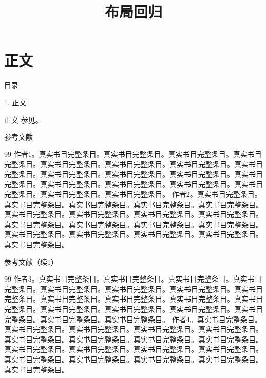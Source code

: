 \documentclass[aspectratio=169,10pt,fontset=fandol]{ctexbeamer}
\title{布局回归}
\begin{document}
\section{正文}
\begin{frame}[t,fragile]{目录}
\normalsize
{\color{blue}\normalsize 1. 正文\par}\vspace{0.22em}
\end{frame}
\begin{frame}[t,fragile]{正文}
\normalsize
{\normalsize
参见\cite{K1}。
}
\end{frame}
\begin{frame}[t,fragile]{参考文献}
\footnotesize
{\footnotesize
\begin{thebibliography}{99} 作者1。真实书目完整条目。真实书目完整条目。真实书目完整条目。真实书目完整条目。真实书目完整条目。真实书目完整条目。真实书目完整条目。真实书目完整条目。真实书目完整条目。真实书目完整条目。真实书目完整条目。真实书目完整条目。真实书目完整条目。真实书目完整条目。真实书目完整条目。真实书目完整条目。真实书目完整条目。真实书目完整条目。
 作者2。真实书目完整条目。真实书目完整条目。真实书目完整条目。真实书目完整条目。真实书目完整条目。真实书目完整条目。真实书目完整条目。真实书目完整条目。真实书目完整条目。真实书目完整条目。真实书目完整条目。真实书目完整条目。真实书目完整条目。真实书目完整条目。真实书目完整条目。真实书目完整条目。真实书目完整条目。真实书目完整条目。

\end{thebibliography}
}
\end{frame}
\begin{frame}[t,fragile]{参考文献（续1）}
\footnotesize
{\footnotesize
\begin{thebibliography}{99}
 作者3。真实书目完整条目。真实书目完整条目。真实书目完整条目。真实书目完整条目。真实书目完整条目。真实书目完整条目。真实书目完整条目。真实书目完整条目。真实书目完整条目。真实书目完整条目。真实书目完整条目。真实书目完整条目。真实书目完整条目。真实书目完整条目。真实书目完整条目。真实书目完整条目。真实书目完整条目。真实书目完整条目。
 作者4。真实书目完整条目。真实书目完整条目。真实书目完整条目。真实书目完整条目。真实书目完整条目。真实书目完整条目。真实书目完整条目。真实书目完整条目。真实书目完整条目。真实书目完整条目。真实书目完整条目。真实书目完整条目。真实书目完整条目。真实书目完整条目。真实书目完整条目。真实书目完整条目。真实书目完整条目。真实书目完整条目。

\end{thebibliography}
}
\end{frame}
\end{document}
